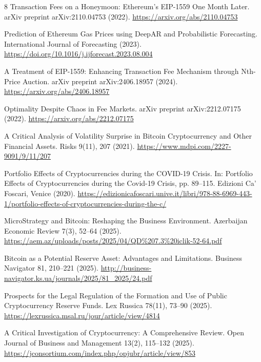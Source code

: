 \documentclass[runningheads]{llncs}
\begin{document}
\begin{thebibliography}{8}
Transaction Fees on a Honeymoon: Ethereum's EIP-1559 One Month Later.
arXiv preprint arXiv:2110.04753 (2022).
\url{https://arxiv.org/abs/2110.04753}

Prediction of Ethereum Gas Prices using DeepAR and Probabilistic Forecasting.
International Journal of Forecasting (2023).
\url{https://doi.org/10.1016/j.ijforecast.2023.08.004}

A Treatment of EIP-1559: Enhancing Transaction Fee Mechanism through Nth-Price Auction.
arXiv preprint arXiv:2406.18957 (2024).
\url{https://arxiv.org/abs/2406.18957}

Optimality Despite Chaos in Fee Markets.
arXiv preprint arXiv:2212.07175 (2022).
\url{https://arxiv.org/abs/2212.07175}


A Critical Analysis of Volatility Surprise in Bitcoin Cryptocurrency and Other Financial Assets.
Risks 9(11), 207 (2021).
\url{https://www.mdpi.com/2227-9091/9/11/207}

Portfolio Effects of Cryptocurrencies during the COVID-19 Crisis.
In: Portfolio Effects of Cryptocurrencies during the Covid-19 Crisis, pp. 89--115.
Edizioni Ca' Foscari, Venice (2020).
\url{https://edizionicafoscari.unive.it/libri/978-88-6969-443-1/portfolio-effects-of-cryptocurrencies-during-the-c/}

MicroStrategy and Bitcoin: Reshaping the Business Environment.
Azerbaijan Economic Review 7(3), 52--64 (2025).
\url{https://aem.az/uploads/posts/2025/04/QD%207.3%20iclik-52-64.pdf}

Bitcoin as a Potential Reserve Asset: Advantages and Limitations.
Business Navigator 81, 210--221 (2025).
\url{http://business-navigator.ks.ua/journals/2025/81_2025/24.pdf}

Prospects for the Legal Regulation of the Formation and Use of Public Cryptocurrency Reserve Funds.
Lex Russica 78(11), 73--90 (2025).
\url{https://lexrussica.msal.ru/jour/article/view/4814}

A Critical Investigation of Cryptocurrency: A Comprehensive Review.
Open Journal of Business and Management 13(2), 115--132 (2025).
\url{https://jconsortium.com/index.php/opjubr/article/view/853}


\end{thebibliography}
\end{document}
